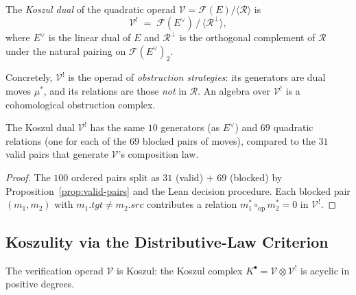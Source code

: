 \documentclass[11pt]{article}
\newcommand{\Vop}{\mathcal{V}}           %
\newcommand{\Kd}{\mathcal{V}^{!}}        %
\newcommand{\Fop}{\mathcal{F}}           %
\newcommand{\Kcom}{K^{\bullet}}          %
\newcommand{\opcomp}{\circ_{\mathrm{op}}}%
\newcommand{\quadrel}{\mathcal{R}}       %
\begin{document}
\begin{definition}\label{def:koszuldual}
The \emph{Koszul dual} of the quadratic operad
$\Vop = \Fop(E)/\langle\quadrel\rangle$ is
\[
  \Kd \;=\; \Fop(E^{\vee}) \,/\, \langle \quadrel^{\perp} \rangle,
\]
where $E^{\vee}$ is the linear dual of $E$ and $\quadrel^{\perp}$ is
the orthogonal complement of $\quadrel$ under the natural pairing on
$\Fop(E^{\vee})_2$.
\end{definition}

Concretely, $\Kd$ is the operad of \emph{obstruction strategies}: its
generators are dual moves $\mu^*$, and its relations are those
\emph{not} in $\quadrel$.  An algebra over $\Kd$ is a cohomological
obstruction complex.

\begin{proposition}\label{prop:kd-generators}
The Koszul dual $\Kd$ has the same $10$ generators (as $E^\vee$) and
$69$ quadratic relations (one for each of the $69$ blocked pairs
of moves), compared to the $31$ valid pairs that generate $\Vop$'s
composition law.
\end{proposition}

\begin{proof}
The $100$ ordered pairs split as $31$ (valid) $+$ $69$ (blocked) by
Proposition~\ref{prop:valid-pairs} and the Lean decision procedure.
Each blocked pair $(m_1, m_2)$ with $m_1.\mathit{tgt} \neq m_2.\mathit{src}$
contributes a relation $m_1^* \opcomp m_2^* = 0$ in $\Kd$.
\end{proof}

\subsection{Koszulity via the Distributive-Law Criterion}

\begin{theorem}[Koszulity of $\Vop$]\label{thm:koszul}
The verification operad $\Vop$ is Koszul: the Koszul complex
$\Kcom = \Vop \otimes \Kd$ is acyclic in positive degrees.
\end{theorem}
\end{document}
